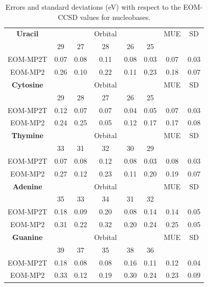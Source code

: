 \documentclass[12pt,nofootinbib]{revtex4}
\begin{document}
\begin{table}[!htbp]
  \centering
  \caption{Errors and standard deviations (eV) with respect to the EOM-CCSD values for nucleobases.}
    \begin{tabular}{c|ccccc|cc}
    \toprule
    \textbf{Uracil} &  &&Orbital&&       & MUE   & SD \\
          & 29    & 27    & 28    & 26    & 25    &       &  \\
          \hline
    EOM-MP2T & 0.07  & 0.08  & 0.11  & 0.08  & 0.03  & 0.07  & 0.03 \\
    EOM-MP2 & 0.26  & 0.10  & 0.22  & 0.11  & 0.23  & 0.18  & 0.07 \\
    \hline
    \textbf{Cytosine} & &&Orbital&&          & MUE   & SD \\
          & 29    & 28    & 27    & 26    & 25    &       &  \\
          \hline
    EOM-MP2T & 0.12  & 0.07  & 0.07  & 0.04  & 0.05  & 0.07  & 0.03 \\
    EOM-MP2 & 0.24  & 0.25  & 0.05  & 0.12  & 0.17  & 0.17  & 0.08 \\
    \hline
    \textbf{Thymine} &&&Orbital&&           & MUE   & SD \\
          & 33    & 31    & 32    & 30    & 29    &       &  \\
          \hline
    EOM-MP2T & 0.07  & 0.08  & 0.12  & 0.08  & 0.03  & 0.08  & 0.03 \\
    EOM-MP2 & 0.27  & 0.12  & 0.23  & 0.11  & 0.20  & 0.19  & 0.07 \\
    \hline
    \textbf{Adenine} &&&Orbital&&        & MUE   & SD\\
          & 35    & 33    & 34    & 31    & 32    &       &  \\
    \hline
    EOM-MP2T & 0.18  & 0.09  & 0.20  & 0.08  & 0.14  & 0.14  & 0.05 \\
    EOM-MP2 & 0.31  & 0.22  & 0.32  & 0.20  & 0.24  & 0.25  & 0.05 \\
    \hline
    \textbf{Guanine} & &&Orbital&&           &       MUE   & SD   \\
          & 39    & 37    & 35    & 38    & 36    & & \\
    \hline
    EOM-MP2T & 0.18  & 0.08  & 0.08  & 0.16  & 0.11  & 0.12  & 0.04 \\
    EOM-MP2 & 0.33  & 0.12  & 0.19  & 0.30  & 0.24  & 0.23  & 0.09 \\
    \hline\hline
    \end{tabular}%
  \label{tab:errors-nucleobases}%
\end{table}%
\end{document}
